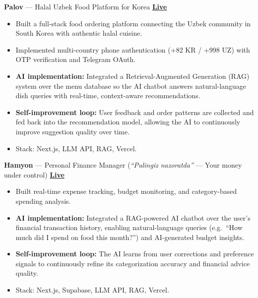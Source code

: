 \documentclass[11pt,a4paper]{article}
\begin{document}
\textbf{Palov} --- Halal Uzbek Food Platform for Korea \hfill {\large\textbf{\href{https://www.palov.app/}{Live}}}
\begin{itemize}
    \item Built a full-stack food ordering platform connecting the Uzbek community in South Korea
with authentic halal cuisine.
    \item Implemented multi-country phone authentication (+82 KR / +998 UZ) with OTP verification and Telegram OAuth.
    \item \textbf{AI implementation:} Integrated a Retrieval-Augmented Generation (RAG) system over
the menu database so the AI chatbot answers natural-language dish queries with real-time,
context-aware recommendations.
    \item \textbf{Self-improvement loop:} User feedback and order patterns are collected and fed back
into the recommendation model, allowing the AI to continuously improve suggestion quality over time.
    \item Stack: Next.js, LLM API, RAG, Vercel.
\end{itemize}

\medskip

\textbf{Hamyon} --- Personal Finance Manager (\textit{``Pulingiz nazoratda''} --- Your money under control) \hfill {\large\textbf{\href{https://hamyon-six.vercel.app/}{Live}}}
\begin{itemize}
    \item Built real-time expense tracking, budget monitoring, and category-based spending analysis.
    \item \textbf{AI implementation:} Integrated a RAG-powered AI chatbot over the user's financial
transaction history, enabling natural-language queries (e.g.\ ``How much did I spend on
food this month?'') and AI-generated budget insights.
    \item \textbf{Self-improvement loop:} The AI learns from user corrections and preference signals to
continuously refine its categorization accuracy and financial advice quality.
    \item Stack: Next.js, Supabase, LLM API, RAG, Vercel.
\end{itemize}

\medskip
\end{document}
